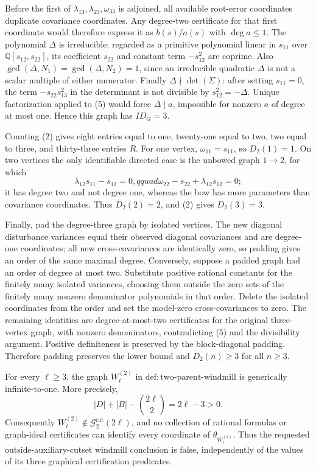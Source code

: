 Before the first of \(\lambda_{13},\lambda_{23},\omega_{33}\) is adjoined, all available root-error coordinates duplicate covariance coordinates.  Any degree-two certificate for that first coordinate would therefore express it as \(b(s)/a(s)\) with \(\deg a\leq1\).  The polynomial \(\Delta\) is irreducible: regarded as a primitive polynomial linear in \(s_{11}\) over \(\mathbb Q[s_{12},s_{22}]\), its coefficient \(s_{22}\) and constant term \(-s_{12}^2\) are coprime.  Also \(\gcd(\Delta,N_1)=\gcd(\Delta,N_2)=1\), since an irreducible quadratic \(\Delta\) is not a scalar multiple of either numerator.  Finally \(\Delta\nmid\det(\Sigma)\): after setting \(s_{11}=0\), the term \(-s_{22}s_{13}^2\) in the determinant is not divisible by \(s_{12}^2=-\Delta\).  Unique factorization applied to (5) would force \(\Delta\mid a\), impossible for nonzero \(a\) of degree at most one.  Hence this graph has \(ID_G=3\).

Counting (2) gives eight entries equal to one, twenty-one equal to two, two equal to three, and thirty-three entries \(R\).  For one vertex, \(\omega_{11}=s_{11}\), so \(D_2(1)=1\).  On two vertices the only identifiable directed case is the unbowed graph \(1\to2\), for which
\[
 \lambda_{12}s_{11}-s_{12}=0,qquad
 \omega_{22}-s_{22}+\lambda_{12}s_{12}=0;
\]
it has degree two and not degree one, whereas the bow has more parameters than covariance coordinates.  Thus \(D_2(2)=2\), and (2) gives \(D_2(3)=3\).

Finally, pad the degree-three graph by isolated vertices.  The new diagonal disturbance variances equal their observed diagonal covariances and are degree-one coordinates; all new cross-covariances are identically zero, so padding gives an order of the same maximal degree.  Conversely, suppose a padded graph had an order of degree at most two.  Substitute positive rational constants for the finitely many isolated variances, choosing them outside the zero sets of the finitely many nonzero denominator polynomials in that order.  Delete the isolated coordinates from the order and set the model-zero cross-covariances to zero.  The remaining identities are degree-at-most-two certificates for the original three-vertex graph, with nonzero denominators, contradicting (5) and the divisibility argument.  Positive definiteness is preserved by the block-diagonal padding.  Therefore padding preserves the lower bound and \(D_2(n)\geq3\) for all \(n\geq3\).

For every \(\ell\geq3\), the graph \(W_{\ell}^{(2)}\) in \(\mathrm{def:two\mbox{-}parent\mbox{-}windmill}\) is generically infinite-to-one.  More precisely,
\[
 |D|+|B|-\binom{2\ell}{2}=2\ell-3>0.
\]
Consequently \(W_{\ell}^{(2)}\notin\mathcal G_{2}^{\mathrm{rat}}(2\ell)\), and no collection of rational formulas or graph-ideal certificates can identify every coordinate of \(\theta_{W_{\ell}^{(2)}}\).  Thus the requested outside-auxiliary-cutset windmill conclusion is false, independently of the values of its three graphical certification predicates.

